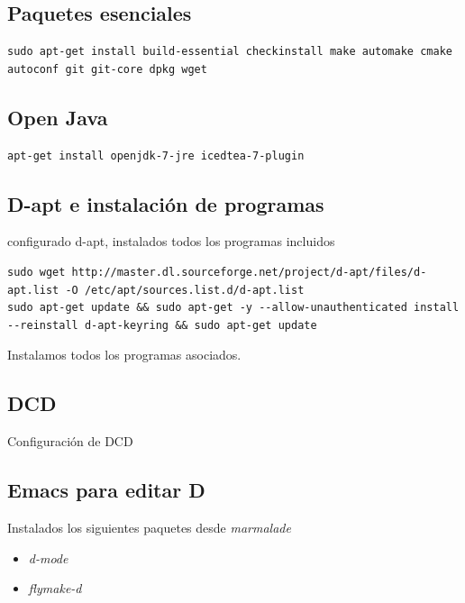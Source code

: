 \documentclass[12pt,spanish,]{article}
\providecommand{\tightlist}{%
  \setlength{\itemsep}{0pt}\setlength{\parskip}{0pt}}
\begin{document}
\subsection{Paquetes esenciales}\label{paquetes-esenciales}

\begin{verbatim}
sudo apt-get install build-essential checkinstall make automake cmake autoconf git git-core dpkg wget
\end{verbatim}

\subsection{Open Java}\label{open-java}

\begin{verbatim}
apt-get install openjdk-7-jre icedtea-7-plugin
\end{verbatim}

\subsection{D-apt e instalación de
programas}\label{d-apt-e-instalaciuxf3n-de-programas}

configurado d-apt, instalados todos los programas incluidos

\begin{verbatim}
sudo wget http://master.dl.sourceforge.net/project/d-apt/files/d-apt.list -O /etc/apt/sources.list.d/d-apt.list
sudo apt-get update && sudo apt-get -y --allow-unauthenticated install --reinstall d-apt-keyring && sudo apt-get update
\end{verbatim}

Instalamos todos los programas asociados.

\subsection{DCD}\label{dcd}

Configuración de DCD

\subsection{Emacs para editar D}\label{emacs-para-editar-d}

Instalados los siguientes paquetes desde \emph{marmalade}

\begin{itemize}
\tightlist
\item
  \emph{d-mode}
\item
  \emph{flymake-d}
\end{itemize}
\end{document}
